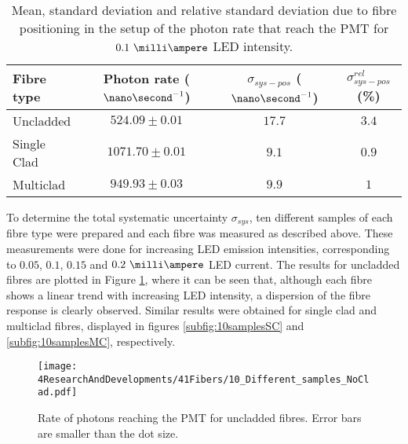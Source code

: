 \begin{table}[htbp]
\centering{}%
\begin{tabular}{lccc}
\toprule 
Fibre type & Photon rate ($\nano\second^{-1}$) & $\sigma_{sys-pos}$ ($\nano\second^{-1}$) & $\sigma^{rel}_{sys-pos}$ (\%) \tabularnewline
\midrule
\midrule 
Uncladded & $524.09 \pm 0.01$ & $17.7$ & $3.4$ \tabularnewline
Single Clad & $1071.70 \pm 0.01$ & $9.1$ & $0.9$ \tabularnewline
Multiclad & $949.93 \pm 0.03$ & $9.9$ & $1$ \tabularnewline
\bottomrule
\end{tabular}
\caption{Mean, standard deviation and relative standard deviation due to fibre positioning in the setup of the photon rate that reach the PMT for $0.1~\milli\ampere$ LED intensity.}
\label{tab:PositionStandardDeviation}
\end{table}



To determine the total systematic uncertainty $\sigma_{sys}$, ten different samples of each fibre type were prepared and each fibre was measured as described above. These measurements were done for increasing LED emission intensities, corresponding to $0.05$, $0.1$, $0.15$ and $0.2~\milli\ampere$ LED current. The results for uncladded fibres are plotted in Figure \ref{fig:10samplesNC}, where it can be seen that, although each fibre shows a linear trend with increasing LED intensity, a dispersion of the fibre response is clearly observed. Similar results were obtained for single clad and multiclad fibres, displayed in figures \ref{subfig:10samplesSC} and \ref{subfig:10samplesMC}, respectively.

\begin{figure}[h]
\centering
\texttt{[image: 4ResearchAndDevelopments/41Fibers/10\_Different\_samples\_NoClad.pdf]}
\caption{Rate of photons reaching the PMT for uncladded fibres. Error bars are smaller than the dot size.\label{fig:10samplesNC}}
\end{figure}

